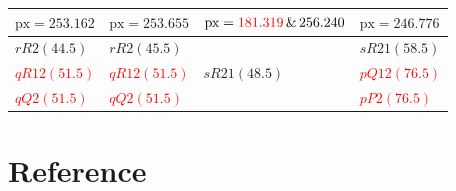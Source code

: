 \documentclass[aspectratio=43,scheme=plain]{ctexbeamer}
\begin{document}
\begin{frame}{\insertsubsubsection}
\begin{table}
\begin{tabularx}{0.97\textwidth}{llll}
			\midrule   
			$\text{px}=253.162$ & $\text{px}=253.655$ & $\text{px}=\textcolor{red}{181.319}\,\&\,256.240$ &$ \text{px}=246.776$ \\  
			\midrule 
			$rR2\left( 44.5\right) $ & $rR2\left( 45.5\right) $ &  &$sR21\left( 58.5\right) $\\  
			\textcolor{red}{$qR12\left( 51.5\right) $} & \textcolor{red}{$qR12 \left( 51.5\right) $} &  $sR21\left( 48.5\right) $ & \textcolor{red}{$pQ12 \left( 76.5\right) $} \\ 
			\textcolor{red}{$qQ2\left(  51.5\right) $} & \textcolor{red}{$qQ2\left(  51.5\right) $} &   & \textcolor{red}{$pP2\left(  76.5\right) $} \\ 
			\bottomrule    
		\end{tabularx}%
	\end{table}
\end{frame}

%	
%	
%	
%	
%
\section*{Reference}
\begin{frame}{\insertsection}
	\printbibliography
\end{frame}
\end{document}

